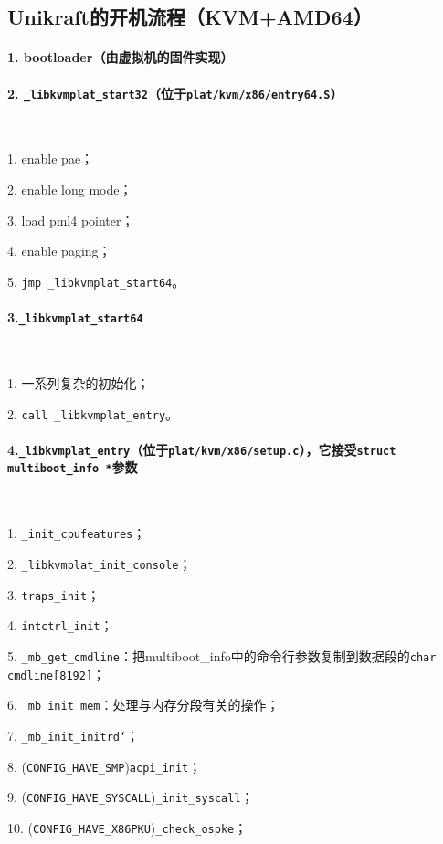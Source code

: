 \documentclass[UTF8,fontset=none,linespread=1.15]{ctexart}
\begin{document}
\subsection{Unikraft的开机流程（KVM+AMD64）}
\paragraph{1. bootloader（由虚拟机的固件实现）}
\paragraph{2. \texttt{\_libkvmplat\_start32}（位于\texttt{plat/kvm/x86/entry64.S}）}
~\par
1. enable pae；

2. enable long mode；

3. load pml4 pointer；

4. enable paging；

5. \texttt{jmp \_libkvmplat\_start64}。

\paragraph{3.\texttt{\_libkvmplat\_start64}}
~\par
1. 一系列复杂的初始化；

2. \texttt{call \_libkvmplat\_entry}。
\paragraph{4.\texttt{\_libkvmplat\_entry}（位于\texttt{plat/kvm/x86/setup.c}），它接受\texttt{struct multiboot\_info *}参数}
~\par
1. \texttt{\_init\_cpufeatures}；

2. \texttt{\_libkvmplat\_init\_console}；

3. \texttt{traps\_init}；

4. \texttt{intctrl\_init}；

5. \texttt{\_mb\_get\_cmdline}：把multiboot\_info中的命令行参数复制到数据段的\texttt{char cmdline[8192]}；

6. \texttt{\_mb\_init\_mem}：处理与内存分段有关的操作；

7. \texttt{\_mb\_init\_initrd`}；

8. (\texttt{CONFIG\_HAVE\_SMP})\texttt{acpi\_init}；

9. (\texttt{CONFIG\_HAVE\_SYSCALL})\texttt{\_init\_syscall}；

10. (\texttt{CONFIG\_HAVE\_X86PKU})\texttt{\_check\_ospke}；
\end{document}
